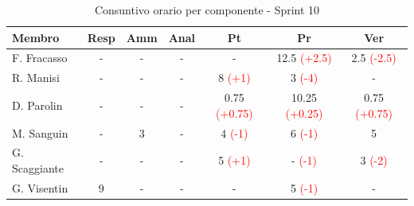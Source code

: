 \documentclass[a4paper,12pt]{article}
\begin{document}
\begin{table}[H]
    \centering
    \renewcommand{\arraystretch}{1.4}
    \footnotesize
    \begin{tabularx}{\textwidth}{|l|C|C|C|C|C|C|}
        \hline
        \textbf{Membro} & \textbf{Resp} & \textbf{Amm} & \textbf{Anal} & \textbf{Pt} & \textbf{Pr} & \textbf{Ver} \\
        \hline
        F. Fracasso & - & - & - & - & 12.5 \textcolor{red}{(+2.5)}& 2.5 \textcolor{red}{(-2.5)} \\
        \hline
        R. Manisi & - & - & - & 8 \textcolor{red}{(+1)} & 3 \textcolor{red}{(-4)}& - \\
        \hline
        D. Parolin & - & - & - & 0.75 \textcolor{red}{(+0.75)} & 10.25 \textcolor{red}{(+0.25)}& 0.75 \textcolor{red}{(+0.75)}\\
        \hline
        M. Sanguin & - & 3 & - & 4 \textcolor{red}{(-1)} & 6 \textcolor{red}{(-1)}& 5 \\
        \hline
        G. Scaggiante & - & - & - & 5 \textcolor{red}{(+1)}& - \textcolor{red}{(-1)} & 3 \textcolor{red}{(-2)}\\
        \hline
        G. Visentin & 9 & - & - & - & 5 \textcolor{red}{(-1)}& - \\
        \hline
    \end{tabularx}
    \caption{Consuntivo orario per componente - Sprint 10}
    \label{tab:consuntivo_sprint10}
\end{table}
\end{document}
